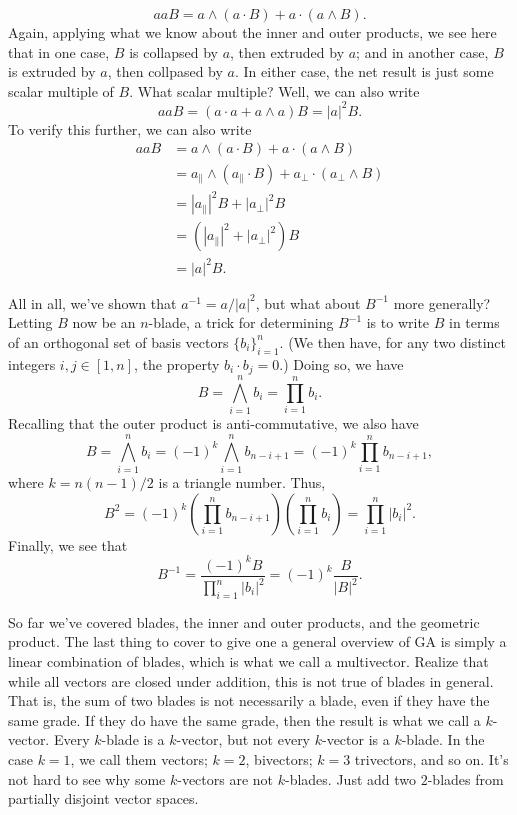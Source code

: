 \documentclass[12pt]{article}
\newcommand{\prl}{\parallel}
\newcommand{\prp}{\perp}
\begin{document}
\begin{equation}
aaB = a\wedge(a\cdot B) + a\cdot(a\wedge B).
\end{equation}
Again, applying what we know about the inner and outer products, we see here that in one case,
$B$ is collapsed by $a$, then extruded by $a$; and in another case, $B$ is extruded by $a$, then
collpased by $a$.  In either case, the net result is just some scalar multiple of $B$.  What scalar multiple?
Well, we can also write
\begin{equation}
aaB = (a\cdot a + a\wedge a)B = |a|^2 B.
\end{equation}
To verify this further, we can also write
\begin{align}
aaB &= a\wedge(a\cdot B) + a\cdot(a\wedge B) \\
 &= a_{\prl}\wedge(a_{\prl}\cdot B) + a_{\prp}\cdot(a_{\prp}\wedge B) \\
 &= |a_{\prl}|^2 B + |a_{\prp}|^2 B \\
 &= (|a_{\prl}|^2 + |a_{\prp}|^2)B \\
 &= |a|^2 B.
\end{align}

All in all, we've shown that $a^{-1}=a/|a|^2$, but what about $B^{-1}$ more generally?
Letting $B$ now be an $n$-blade,
a trick for determining $B^{-1}$ is to write $B$ in terms of an orthogonal set of basis vectors $\{b_i\}_{i=1}^n$.
(We then have, for any two distinct integers $i,j\in[1,n]$, the property $b_i\cdot b_j=0$.)
Doing so, we have
\begin{equation}
B = \bigwedge_{i=1}^n b_i = \prod_{i=1}^n b_i.
\end{equation}
Recalling that the outer product is anti-commutative, we also have
\begin{equation}
B = \bigwedge_{i=1}^n b_i = (-1)^k\bigwedge_{i=1}^n b_{n-i+1} = (-1)^k\prod_{i=1}^n b_{n-i+1},
\end{equation}
where $k=n(n-1)/2$ is a triangle number.  Thus,
\begin{equation}
B^2 = (-1)^k\left(\prod_{i=1}^n b_{n-i+1}\right)\left(\prod_{i=1}^n b_i\right) = \prod_{i=1}^n |b_i|^2.
\end{equation}
Finally, we see that
\begin{equation}
B^{-1}=\frac{(-1)^kB}{\prod_{i=1}^n |b_i|^2} = (-1)^k\frac{B}{|B|^2}.
\end{equation}

So far we've covered blades, the inner and outer products, and the geometric product.  The last thing
to cover to give one a general overview of GA is simply a linear combination of blades, which is what
we call a multivector.  Realize that while all vectors are closed under addition, this is not true of blades
in general.  That is, the sum of two blades is not necessarily a blade, even if they have the same grade.
If they do have the same grade, then the result is what we call a $k$-vector.  Every $k$-blade is a
$k$-vector, but not every $k$-vector is a $k$-blade.  In the case $k=1$, we call them vectors; $k=2$,
bivectors; $k=3$ trivectors, and so on.  It's not hard to see why some $k$-vectors are not $k$-blades.
Just add two $2$-blades from partially disjoint vector spaces.
\end{document}
